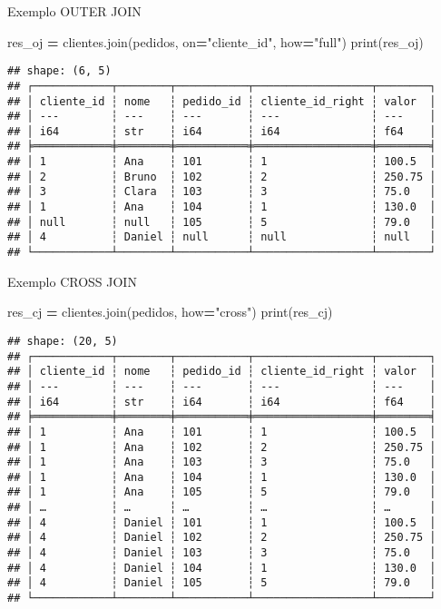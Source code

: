 \documentclass[
]{article}
\newenvironment{Shaded}{\begin{snugshade}}{\end{snugshade}}
\newcommand{\BuiltInTok}[1]{#1}
\newcommand{\NormalTok}[1]{#1}
\newcommand{\OperatorTok}[1]{\textcolor[rgb]{0.81,0.36,0.00}{\textbf{#1}}}
\newcommand{\StringTok}[1]{\textcolor[rgb]{0.31,0.60,0.02}{#1}}
\begin{document}
Exemplo OUTER JOIN

\begin{Shaded}
\begin{Highlighting}[]
\NormalTok{res\_oj }\OperatorTok{=}\NormalTok{ clientes.join(pedidos, on}\OperatorTok{=}\StringTok{"cliente\_id"}\NormalTok{, how}\OperatorTok{=}\StringTok{"full"}\NormalTok{)}
\BuiltInTok{print}\NormalTok{(res\_oj)}
\end{Highlighting}
\end{Shaded}

\begin{verbatim}
## shape: (6, 5)
## ┌────────────┬────────┬───────────┬──────────────────┬────────┐
## │ cliente_id ┆ nome   ┆ pedido_id ┆ cliente_id_right ┆ valor  │
## │ ---        ┆ ---    ┆ ---       ┆ ---              ┆ ---    │
## │ i64        ┆ str    ┆ i64       ┆ i64              ┆ f64    │
## ╞════════════╪════════╪═══════════╪══════════════════╪════════╡
## │ 1          ┆ Ana    ┆ 101       ┆ 1                ┆ 100.5  │
## │ 2          ┆ Bruno  ┆ 102       ┆ 2                ┆ 250.75 │
## │ 3          ┆ Clara  ┆ 103       ┆ 3                ┆ 75.0   │
## │ 1          ┆ Ana    ┆ 104       ┆ 1                ┆ 130.0  │
## │ null       ┆ null   ┆ 105       ┆ 5                ┆ 79.0   │
## │ 4          ┆ Daniel ┆ null      ┆ null             ┆ null   │
## └────────────┴────────┴───────────┴──────────────────┴────────┘
\end{verbatim}

Exemplo CROSS JOIN

\begin{Shaded}
\begin{Highlighting}[]
\NormalTok{res\_cj }\OperatorTok{=}\NormalTok{ clientes.join(pedidos, how}\OperatorTok{=}\StringTok{"cross"}\NormalTok{)}
\BuiltInTok{print}\NormalTok{(res\_cj)}
\end{Highlighting}
\end{Shaded}

\begin{verbatim}
## shape: (20, 5)
## ┌────────────┬────────┬───────────┬──────────────────┬────────┐
## │ cliente_id ┆ nome   ┆ pedido_id ┆ cliente_id_right ┆ valor  │
## │ ---        ┆ ---    ┆ ---       ┆ ---              ┆ ---    │
## │ i64        ┆ str    ┆ i64       ┆ i64              ┆ f64    │
## ╞════════════╪════════╪═══════════╪══════════════════╪════════╡
## │ 1          ┆ Ana    ┆ 101       ┆ 1                ┆ 100.5  │
## │ 1          ┆ Ana    ┆ 102       ┆ 2                ┆ 250.75 │
## │ 1          ┆ Ana    ┆ 103       ┆ 3                ┆ 75.0   │
## │ 1          ┆ Ana    ┆ 104       ┆ 1                ┆ 130.0  │
## │ 1          ┆ Ana    ┆ 105       ┆ 5                ┆ 79.0   │
## │ …          ┆ …      ┆ …         ┆ …                ┆ …      │
## │ 4          ┆ Daniel ┆ 101       ┆ 1                ┆ 100.5  │
## │ 4          ┆ Daniel ┆ 102       ┆ 2                ┆ 250.75 │
## │ 4          ┆ Daniel ┆ 103       ┆ 3                ┆ 75.0   │
## │ 4          ┆ Daniel ┆ 104       ┆ 1                ┆ 130.0  │
## │ 4          ┆ Daniel ┆ 105       ┆ 5                ┆ 79.0   │
## └────────────┴────────┴───────────┴──────────────────┴────────┘
\end{verbatim}
\end{document}

